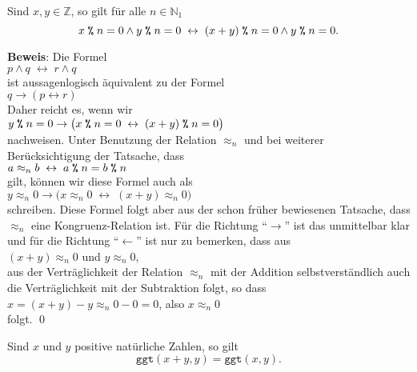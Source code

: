 \begin{Lemma} \label{lemma:modulo1}
Sind $x, y \in \mathbb{Z}$, so gilt für alle $n \in \mathbb{N}_1$
\[ x \;\texttt{\%}\; n = 0 \wedge y \;\texttt{\%}\; n = 0 \;\leftrightarrow\; 
   (x + y) \;\texttt{\%}\; n = 0 \wedge y \;\texttt{\%}\; n = 0. 
\]  
\end{Lemma}
\textbf{Beweis}:  Die Formel
\\[0.2cm]
\hspace*{1.3cm}
$p \wedge q \;\leftrightarrow\; r \wedge q$
\\[0.2cm]
ist aussagenlogisch äquivalent zu der Formel
\\[0.2cm]
\hspace*{1.3cm}
$q \rightarrow (p \leftrightarrow r)$
\\[0.2cm]
Daher reicht es, wenn wir
\\[0.2cm]
\hspace*{1.3cm}
$y \;\texttt{\%}\; n = 0 \rightarrow \bigl(x \;\texttt{\%}\; n = 0 \;\leftrightarrow\; (x + y) \;\texttt{\%}\; n = 0\bigr)$ 
\\[0.2cm]
nachweisen.  Unter Benutzung der Relation $\approx_n$ und bei weiterer Berücksichtigung
der Tatsache, dass 
\\[0.2cm]
\hspace*{1.3cm}
 $a \approx_n b \;\leftrightarrow\; a \;\texttt{\%}\; n = b \;\texttt{\%}\; n$ 
\\[0.2cm]
gilt, können wir diese Formel auch als
\\[0.2cm]
\hspace*{1.3cm}
$y \approx_n 0 \rightarrow \bigl(x \approx_n 0 \;\leftrightarrow\; (x + y) \approx_n 0\bigr)$ 
\\[0.2cm]
schreiben.  Diese Formel folgt aber aus der schon früher bewiesenen Tatsache, dass
$\approx_n$ eine Kongruenz-Relation ist.  Für die Richtung ``$\rightarrow$'' ist das
unmittelbar klar und für die Richtung ``$\leftarrow$'' ist nur zu bemerken, dass aus
\\[0.2cm]
\hspace*{1.3cm}
$(x + y) \approx_n 0$ \quad und \quad $y \approx_n 0$, 
\\[0.2cm]
aus der Verträglichkeit der Relation $\approx_n$ mit der Addition selbstverständlich auch
die Verträglichkeit mit der Subtraktion folgt, so dass
\\[0.2cm]
\hspace*{1.3cm}
$x = (x + y) - y \approx_n 0 - 0 = 0$, \quad also $x \approx_n 0$
\\[0.2cm]
folgt. \qed


\begin{Korollar} \label{korollar:ggt}
Sind $x$ und $y$ positive natürliche Zahlen, so gilt
\[ \texttt{ggt}(x + y, y) = \texttt{ggt}(x,y). \]  
\end{Korollar}

